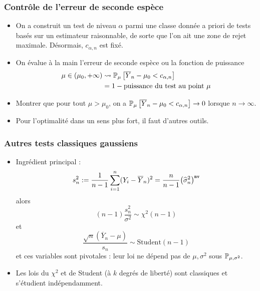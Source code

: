 \begin{frame}
\frametitle{Contrôle de l'erreur de seconde espèce}
\begin{itemize}
\item On a construit un test de niveau $\alpha$ parmi une classe \alert{donnée a priori} de tests basés sur un estimateur  raisonnable, de sorte que l'on ait une zone de rejet maximale. Désormais, $c_{\alpha, n}$ est \alert{fixé}.
\item On \alert{évalue à la main} l'erreur de seconde espèce ou la \alert{fonction de puissance}
\begin{align*}
\mu \in (\mu_0,+\infty) & \leadsto \operatorname{{\mathbb P}}_\mu\big[\overline{Y}_n - \mu_0 < c_{\alpha,n}\big] \\
&= 1 - {\text{puissance du test au point }}\mu
\end{align*}
\item \alert{Montrer que} pour tout $\mu > \mu_0$, on a $\operatorname{{\mathbb P}}_\mu\big[\overline{Y}_n - \mu_0 < c_{\alpha,n}\big] \rightarrow 0$ lorsque $n\rightarrow \infty$.
\item Pour l'optimalité dans un sens plus fort, il faut \alert{ d'autres outils}.
\end{itemize}
\end{frame}

\begin{frame}
\frametitle{Autres tests classiques gaussiens}
\begin{itemize}
\item \alert{Ingrédient principal} :
$$s_n^2:=\frac{1}{n-1}\sum_{i = 1}^n (Y_i-\overline{Y}_n)^2 = \frac{n}{n-1}\big(\widehat \sigma^2_n\big)^{{\tt mv}}$$
alors
$$(n-1)\frac{s_n^2}{\sigma^2} \sim \chi^2(n-1)$$
et
$$\frac{\sqrt{n}(\overline{Y}_n-\mu)}{s_n} \sim \text{Student}(n-1)$$
et ces variables sont \alert{pivotales} : leur loi ne dépend pas de $\mu,\sigma^2$ sous $\operatorname{{\mathbb P}}_{\mu,\sigma^2}$.
\item Les lois du \alert{$\chi^2$} et de \alert{Student} (à $k$ degrés de liberté) sont classiques et s'étudient indépendamment.
\end{itemize}
\end{frame}

